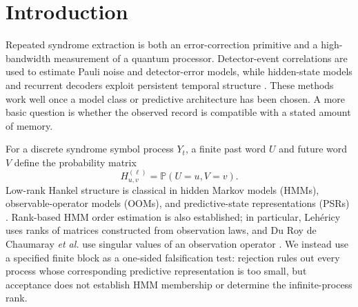 \documentclass[11pt]{article}
\newcommand{\Prob}{\mathbb{P}}
\begin{document}
\begin{abstract}
The practical analysis has three inferential layers: certified but conservative rank tests, empirically calibrated rank-one diagnostics, and conditional model checking against a supplied circuit model. On two public Google distance-5 surface-code records totaling $10^5$ shots, the largest circuit-relative discrepancy occurs at detector track $x2\_y5$ in both memory bases. Its reported within-basis Benjamini--Hochberg adjusted values remain below $0.05$ after the arbitrary-dependence Benjamini--Yekutieli factor ($q_{\rm BY}\approx0.0082$ and $0.0113$), and the discrepancy persists across tested horizons and both acquisition halves. This is a finite-horizon mismatch with the supplied noisy circuit model; it does not identify leakage or any other microscopic mechanism. We then test rank at most two directly on the same experimental tables. The distribution-free rule rejects nowhere, and synthetic controls show that it is underpowered at $5\times10^4$ shots. A sharper simultaneous confidence-box certificate rejects rank at most two at one track, $x2\_y7$ in memory-$Z$, under a conservative allowance for 288 comparisons. Under independent shots from a common law this gives $D_{\min}^{\rm SPP}\ge2$ for that pooled four-event law, and rules out every reweighting of the supplied independent-Pauli error model. Because neither half of the record certifies on its own, it does not separate within-shot memory from shot-to-shot drift.
\end{abstract}

\section{Introduction}

Repeated syndrome extraction is both an error-correction primitive and a high-bandwidth measurement of a quantum processor. Detector-event correlations are used to estimate Pauli noise and detector-error models, while hidden-state models and recurrent decoders exploit persistent temporal structure \cite{wagner2021optimal,blumekohout2025dem,varbanov2020leakage,bultink2020leakage,bausch2024alphaqubit}. These methods work well once a model class or predictive architecture has been chosen. A more basic question is whether the observed record is compatible with a stated amount of memory.

For a discrete syndrome symbol process $Y_t$, a finite past word $U$ and future word $V$ define the probability matrix
\[
H^{(\ell)}_{u,v}=\Prob(U=u,V=v).
\]
Low-rank Hankel structure is classical in hidden Markov models (HMMs), observable-operator models (OOMs), and predictive-state representations (PSRs) \cite{jaeger2000oom,littman2001psr,singh2012psr,hsu2012spectral}. Rank-based HMM order estimation is also established; in particular, Leh\'ericy uses ranks of matrices constructed from observation laws, and Du Roy de Chaumaray \emph{et al.} use singular values of an observation operator \cite{lehericy2019order,duroy2022order}. We instead use a specified finite block as a one-sided falsification test: rejection rules out every process whose corresponding predictive representation is too small, but acceptance does not establish HMM membership or determine the infinite-process rank.
\end{document}
